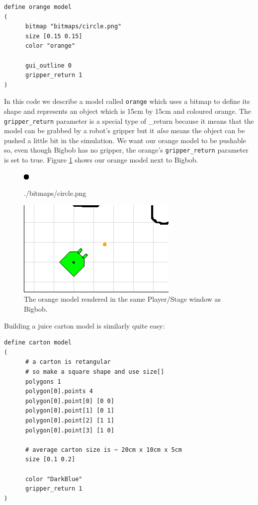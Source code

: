 \documentclass[a4paper]{article}
\newcommand{\plst}{Player/Stage\xspace}
\begin{document}
\begin{verbatim}
define orange model
(
      bitmap "bitmaps/circle.png"
      size [0.15 0.15]
      color "orange"
      
      gui_outline 0
      gripper_return 1
)
\end{verbatim}
In this code we describe a model called \verb|orange| which uses a bitmap to define its shape and represents an object which is 15cm by 15cm and coloured orange. The \verb|gripper_return| parameter is a special type of \_return because it means that the model can be grabbed by a robot's gripper but it \emph{also} means the object can be pushed a little bit in the simulation. We want our orange model to be pushable so, even though Bigbob has no gripper, the orange's \verb|gripper_return| parameter is set to true. Figure \ref{fig:orangeandbob} shows our orange model next to Bigbob.
\begin{figure}
	\centering
	\begin{minipage}[c]{0.2\linewidth}
		\centering
		\includegraphics{./pics/oranges_box/circle.png} 
		\caption{./bitmaps/circle.png}
		\label{fig:circle.png}	
	\end{minipage}%
	\hspace{0.1\linewidth}
	\begin{minipage}[c]{0.6\linewidth}
		\centering
		\includegraphics[width=\linewidth]{./pics/oranges_box/orange_and_bob.png} 
		\caption{The orange model rendered in the same \plst window as Bigbob.}
		\label{fig:orangeandbob}
	\end{minipage}	
\end{figure}

Building a juice carton model is similarly quite easy:
\begin{verbatim}
define carton model
(
      # a carton is retangular
      # so make a square shape and use size[]
      polygons 1
      polygon[0].points 4
      polygon[0].point[0] [0 0]
      polygon[0].point[1] [0 1]
      polygon[0].point[2] [1 1]
      polygon[0].point[3] [1 0]
	
      # average carton size is ~ 20cm x 10cm x 5cm
      size [0.1 0.2]
	
      color "DarkBlue"
      gripper_return 1
)
\end{verbatim}
\end{document}
